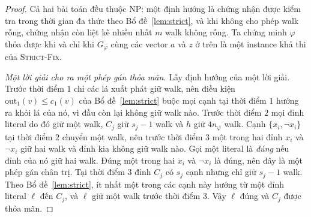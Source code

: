\documentclass[pdflatex,sn-mathphys-num]{sn-jnl}
\theoremstyle{thmstyleone}
\theoremstyle{thmstyletwo}
\theoremstyle{thmstylethree}
\newcommand{\out}{\mathrm{out}}
\newcommand{\SFIX}{\textup{\textsc{Strict-Fix}}}
\begin{document}
\begin{proof}
Cả hai bài toán đều thuộc NP: một định hướng là chứng nhận được kiểm tra trong thời gian đa thức theo Bổ đề~\ref{lem:strict}, và khi không cho phép walk rỗng, chứng nhận còn liệt kê nhiều nhất $m$ walk không rỗng. Ta chứng minh $\varphi$ thỏa được khi và chỉ khi $G_\varphi$ cùng các vector $a$ và $z$ ở trên là một instance khả thi của \SFIX{}.

\emph{Một lời giải cho ra một phép gán thỏa mãn.} Lấy định hướng của một lời giải. Trước thời điểm $1$ chỉ các lá xuất phát giữ walk, nên điều kiện $\out_1(v)\le c_1(v)$ của Bổ đề~\ref{lem:strict} buộc mọi cạnh tại thời điểm $1$ hướng ra khỏi lá của nó, vì đầu còn lại không giữ walk nào. Trước thời điểm $2$ mọi đỉnh literal do đó giữ một walk, $C_j$ giữ $s_j-1$ walk và $h$ giữ $4n_\varphi$ walk. Cạnh $\{x_i,\lnot x_i\}$ tại thời điểm $2$ chuyển một walk, nên trước thời điểm $3$ một trong hai đỉnh $x_i$ và $\lnot x_i$ giữ hai walk và đỉnh kia không giữ walk nào. Gọi một literal là \emph{đúng} nếu đỉnh của nó giữ hai walk. Đúng một trong hai $x_i$ và $\lnot x_i$ là đúng, nên đây là một phép gán chân trị. Tại thời điểm $3$ đỉnh $C_j$ có $s_j$ cạnh nhưng chỉ giữ $s_j-1$ walk. Theo Bổ đề~\ref{lem:strict}, ít nhất một trong các cạnh này hướng từ một đỉnh literal $\ell$ đến $C_j$, và $\ell$ giữ một walk trước thời điểm $3$. Vậy $\ell$ đúng và $C_j$ được thỏa mãn.


\end{proof}
\end{document}
